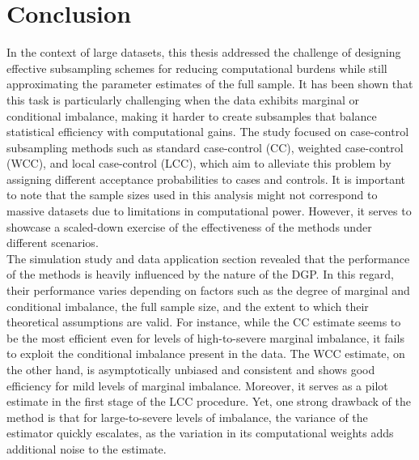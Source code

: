 \section{Conclusion}
\label{sec:Conclusion}

In the context of large datasets, this thesis addressed the challenge of designing effective subsampling schemes for reducing computational burdens while still approximating the parameter estimates of the full sample. It has been shown that this task is particularly challenging when the data exhibits marginal or conditional imbalance, making it harder to create subsamples that balance statistical efficiency with computational gains. The study focused on case-control subsampling methods such as standard case-control (CC), weighted case-control (WCC), and local case-control (LCC), which aim to alleviate this problem by assigning different acceptance probabilities to cases and controls. It is important to note that the sample sizes used in this analysis might not correspond to massive datasets due to limitations in computational power. However, it serves to showcase a scaled-down exercise of the effectiveness of the methods under different scenarios. \\

The simulation study and data application section revealed that the performance of the methods is heavily influenced by the nature of the DGP. In this regard, their performance varies depending on factors such as the degree of marginal and conditional imbalance, the full sample size, and the extent to which their theoretical assumptions are valid. For instance, while the CC estimate seems to be the most efficient even for levels of high-to-severe marginal imbalance, it fails to exploit the conditional imbalance present in the data. The WCC estimate, on the other hand, is asymptotically unbiased and consistent and shows good efficiency for mild levels of marginal imbalance. Moreover, it serves as a pilot estimate in the first stage of the LCC procedure. Yet, one strong drawback of the method is that for large-to-severe levels of imbalance, the variance of the estimator quickly escalates, as the variation in its computational weights adds additional noise to the estimate. \\

